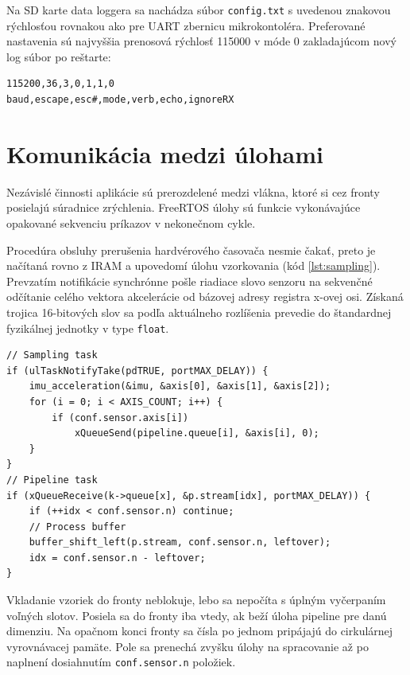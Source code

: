 Na SD karte data loggera sa nachádza súbor \verb|config.txt| s uvedenou znakovou rýchlosťou
rovnakou ako pre UART zbernicu mikrokontoléra. Preferované nastavenia sú najvyššia prenosová rýchlosť 115000
v móde 0 zakladajúcom nový log súbor po reštarte:
\begin{small}
\begin{Verbatim}[frame=single, baselinestretch=1.1]
115200,36,3,0,1,1,0
baud,escape,esc#,mode,verb,echo,ignoreRX
\end{Verbatim}
\end{small}

\section{Komunikácia medzi úlohami}
Nezávislé činnosti aplikácie sú prerozdelené medzi vlákna, ktoré si cez fronty posielajú súradnice zrýchlenia.
FreeRTOS úlohy sú funkcie vykonávajúce opakované sekvenciu príkazov v nekonečnom cykle.

Procedúra obsluhy prerušenia hardvérového časovača nesmie čakať, preto je načítaná rovno z IRAM a upovedomí úlohu vzorkovania
(kód \ref{lst:sampling}). Prevzatím notifikácie synchrónne pošle riadiace slovo senzoru na sekvenčné odčítanie celého vektora
akcelerácie od bázovej adresy registra x-ovej osi. Získaná trojica 16-bitových slov sa podľa aktuálneho rozlíšenia prevedie
do štandardnej fyzikálnej jednotky v type \verb|float|.

\begin{lstlisting}[style=cstyle,caption=Posielanie vzoriek medzi úlohami cez fronty,label={lst:sampling},
 morekeywords={ulTaskNotifyTake,xQueueSend,xQueueReceive,buffer_shift_left,p.stream}]
// Sampling task
if (ulTaskNotifyTake(pdTRUE, portMAX_DELAY)) {
	imu_acceleration(&imu, &axis[0], &axis[1], &axis[2]);
	for (i = 0; i < AXIS_COUNT; i++) {
    	if (conf.sensor.axis[i])
        	xQueueSend(pipeline.queue[i], &axis[i], 0);
    }
}
// Pipeline task
if (xQueueReceive(k->queue[x], &p.stream[idx], portMAX_DELAY)) {
	if (++idx < conf.sensor.n) continue;
    // Process buffer
    buffer_shift_left(p.stream, conf.sensor.n, leftover);
    idx = conf.sensor.n - leftover;
}
\end{lstlisting}
Vkladanie vzoriek do fronty neblokuje, lebo sa nepočíta s úplným vyčerpaním voľných slotov. Posiela sa do fronty
iba vtedy, ak beží úloha pipeline pre danú dimenziu. Na opačnom konci fronty sa čísla po jednom pripájajú do
cirkulárnej vyrovnávacej pamäte. Pole sa prenechá zvyšku úlohy na spracovanie až po naplnení
dosiahnutím \verb|conf.sensor.n| položiek.

